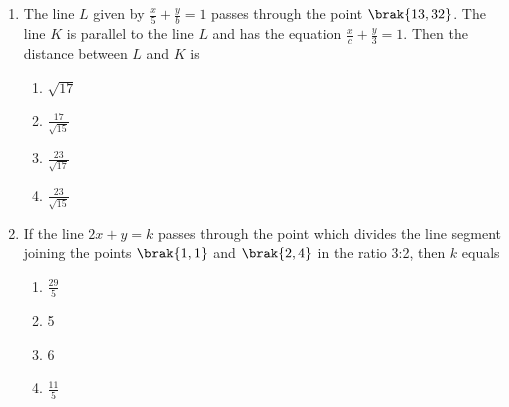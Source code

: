 \begin{enumerate}
\item The line $L$ given by $\frac{x}{5}+\frac{y}{b}=1$ passes through the point $\brak{13, 32}$. The line $K$ is parallel to the line $L$ and has the equation $\frac{x}{c}+\frac{y}{3}=1$. Then the distance between $L$ and $K$ is

\hfill {}
\begin{multicols}{4}
\begin{enumerate}
\item $\sqrt{17}$
\item $\frac{17}{\sqrt{15}}$
\item $\frac{23}{\sqrt{17}}$
\item $\frac{23}{\sqrt{15}}$
\end{enumerate}
\end{multicols} 
%
\item If the line $2x+y=k$ passes through the point which divides the line segment joining the points $\brak{1, 1}$ and $\brak{2, 4}$ in the ratio 3:2, then $k$ equals \hfill {}
\begin{multicols}{4}
\begin{enumerate}
\item $\frac{29}{5}$
\item 5
\item 6
\item $\frac{11}{5}$
\end{enumerate}
\end{multicols} 


\end{enumerate}
